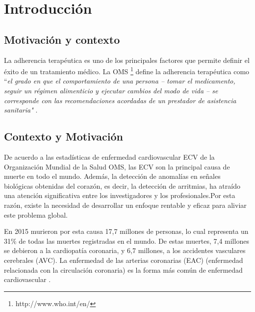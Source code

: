  
 
 
 

\chapter{Introducción}
\section{Motivación y contexto}

La adherencia terapéutica es uno de los principales factores que permite definir el éxito de un tratamiento médico. La \ac{OMS} \footnote{http://www.who.int/en/} define la adherencia terapéutica como ``\textit {el grado en que el comportamiento de una persona -- tomar el medicamento, seguir un régimen alimenticio y ejecutar cambios del modo de vida -- se corresponde con las recomendaciones acordadas de un prestador de asistencia sanitaria"} \citep{who}.

\section{Contexto y Motivación}

De acuerdo a las estadísticas de enfermedad cardiovascular \ac{ECV} de la Organización Mundial de la Salud \ac{OMS}\cite{WHO}, las ECV son la principal causa de muerte en todo el mundo. Además, la detección de anomalías en señales biológicas obtenidas del corazón, es decir, la detección de arritmias, ha atraído una atención significativa entre los investigadores y los profesionales.Por esta razón, existe la necesidad de desarrollar un enfoque rentable y eficaz para aliviar este problema global.\cite{HRS}

En 2015 murieron por esta causa 17,7 millones de personas, lo cual representa un 31\% de todas las muertes registradas en el mundo. De estas muertes, 7,4 millones se debieron a la cardiopatía coronaria, y 6,7 millones, a los accidentes vasculares cerebrales (AVC)\cite{WHO}. 
La enfermedad de las arterias coronarias (EAC) (enfermedad relacionada con la circulación coronaria) es la forma más común de enfermedad cardiovascular \cite{CAD}. 

